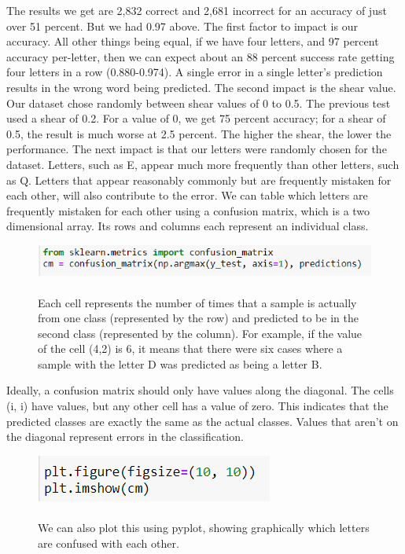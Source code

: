 \documentclass[onecolumn]{article}
\begin{document}
\begin{t}
The results we get are 2,832 correct and 2,681 incorrect for an accuracy of just over
51 percent. But we had 0.97 above. The first factor to impact is our accuracy. All other things being equal, if we have four letters, and 97 percent accuracy per-letter, then we can expect about an 88 percent success rate getting four letters in a row (0.880-0.974). A single error in a single letter's prediction results in the wrong word being predicted.
The second impact is the shear value. Our dataset chose randomly between shear
values of 0 to 0.5. The previous test used a shear of 0.2. For a value of 0, we get 75
percent accuracy; for a shear of 0.5, the result is much worse at 2.5 percent. The
higher the shear, the lower the performance.
The next impact is that our letters were randomly chosen for the dataset. Letters, such as E, appear much more frequently than other letters, such as Q. Letters that appear reasonably commonly but are frequently mistaken for each other, will also contribute to the error.
We can table which letters are frequently mistaken for each other using a confusion
matrix, which is a two dimensional array. Its rows and columns each represent an
individual class.
\end{t}

\begin{figure}[hb!]
    \centering
    \includegraphics[width=.8\linewidth]{54..png}
\caption{\label{fig:demo-bad}
\centering
\\Each cell represents the number of times that a sample is actually from one class
(represented by the row) and predicted to be in the second class (represented by
the column). For example, if the value of the cell (4,2) is 6, it means that there were
six cases where a sample with the letter D was predicted as being a letter B. }
\end{figure}

\begin{t}
Ideally, a confusion matrix should only have values along the diagonal. The cells (i, i)
have values, but any other cell has a value of zero. This indicates that the predicted classes
are exactly the same as the actual classes. Values that aren't on the diagonal represent errors in the classification.
\end{t}

\begin{figure}[ht]
    \centering
    \includegraphics[width=.4\linewidth]{55..png}
\caption{\label{fig:demo-bad}
\centering
\\We can also plot this using pyplot, showing graphically which letters are confused
with each other. }
\end{figure}
\end{document}
